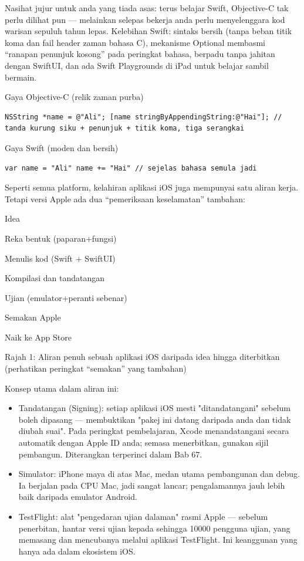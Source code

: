Nasihat jujur untuk anda yang tiada asas: terus belajar Swift, Objective-C tak perlu dilihat pun — melainkan selepas bekerja anda perlu menyelenggara kod warisan sepuluh tahun lepas. Kelebihan Swift: sintaks bersih (tanpa beban titik koma dan fail header zaman bahasa C), mekanisme Optional membasmi “ranapan penunjuk kosong” pada peringkat bahasa, berpadu tanpa jahitan dengan SwiftUI, dan ada Swift Playgrounds di iPad untuk belajar sambil bermain.

Gaya Objective-C (relik zaman purba)

\begin{lstlisting}
NSString *name = @"Ali"; [name stringByAppendingString:@"Hai"]; // tanda kurung siku + penunjuk + titik koma, tiga serangkai
\end{lstlisting}

Gaya Swift (moden dan bersih)

\begin{lstlisting}
var name = "Ali" name += "Hai" // sejelas bahasa semula jadi
\end{lstlisting}


Seperti semua platform, kelahiran aplikasi iOS juga mempunyai satu aliran kerja. Tetapi versi Apple ada dua “pemeriksaan keselamatan” tambahan:

Idea

Reka bentuk (paparan+fungsi)

Menulis kod (Swift + SwiftUI)

Kompilasi dan tandatangan

Ujian (emulator+peranti sebenar)

Semakan Apple

Naik ke App Store

\begin{center}\small\color{gray}Rajah 1: Aliran penuh sebuah aplikasi iOS daripada idea hingga diterbitkan (perhatikan peringkat “semakan” yang tambahan)\end{center}

Konsep utama dalam aliran ini:

\begin{itemize}
  \item Tandatangan (Signing): setiap aplikasi iOS mesti "ditandatangani" sebelum boleh dipasang — membuktikan "pakej ini datang daripada anda dan tidak diubah suai". Pada peringkat pembelajaran, Xcode menandatangani secara automatik dengan Apple ID anda; semasa menerbitkan, gunakan sijil pembangun. Diterangkan terperinci dalam Bab 67.
  \item Simulator: iPhone maya di atas Mac, medan utama pembangunan dan debug. Ia berjalan pada CPU Mac, jadi sangat lancar; pengalamannya jauh lebih baik daripada emulator Android.
  \item TestFlight: alat "pengedaran ujian dalaman" rasmi Apple — sebelum penerbitan, hantar versi ujian kepada sehingga 10000 pengguna ujian, yang memasang dan mencubanya melalui aplikasi TestFlight. Ini keanggunan yang hanya ada dalam ekosistem iOS.
\end{itemize}

